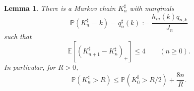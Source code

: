 \documentclass[11pt,letterpaper,reqno]{amsart}
\numberwithin{equation}{section}
\theoremstyle{plain}
\newtheorem{lemma}[theorem]{Lemma}
\theoremstyle{remark}
\newcommand{\E}{\mathbb E}\newcommand{\Pp}{\mathbb P}
\begin{document}
\begin{lemma}\label{lem:spine}
There is a Markov chain $K_n^\sharp$ with marginals
\begin{equation} \label{eq:Markov_marginals}
 \Pp(K^{\sharp}_n = k) = q_n^\sharp(k) := \frac{h_m(k)q_{n,k}}{J_n}
\end{equation}
such that
\begin{equation}\label{eq:increment}
 \E[(K_{n+1}^\sharp-K_n^\sharp)_+]\le4\qquad(n\ge0).
\end{equation}
In particular, for $R>0$,
\begin{equation}\label{eq:sharptail}
 \Pp(K^{\sharp}_n > R) \leq \Pp(K^{\sharp}_0 > R/2) + \frac{8n}{R}.
\end{equation}
\end{lemma}
\end{document}
